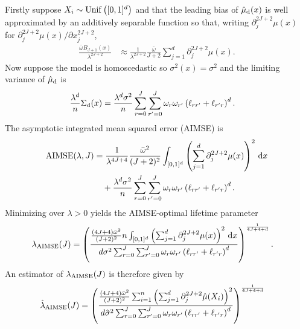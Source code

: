 Firstly suppose $X_i \sim \operatorname{Unif}\big([0,1]^d\big)$
and that the leading bias of $\hat\mu_{\mathrm{d}}(x)$ is well approximated by an
additively separable function so that,
writing $\partial^{2 J + 2}_j \mu(x)$
for $\partial^{2 J + 2}_j \mu(x) / \partial x_j^{2 J + 2}$,
%
\begin{align*}
  \frac{\bar \omega B_{J+1}(x)}{\lambda^{2 J + 2}}
  &\approx
  \frac{1}{\lambda^{2 J + 2}}
  \frac{\bar \omega }{J + 2}
  \sum_{j=1}^d
  \partial^{2 J + 2}_j \mu(x).
\end{align*}
%
Now suppose the model is homoscedastic so $\sigma^2(x) = \sigma^2$ and
the limiting variance of $\hat\mu_{\mathrm{d}}$ is
%
\begin{align*}
  \frac{\lambda^d}{n}
  \Sigma_{\mathrm{d}}(x)
  &=
  \frac{\lambda^d \sigma^2}{n}
  \sum_{r=0}^{J}
  \sum_{r'=0}^{J}
  \omega_r
  \omega_{r'}
  \left( \ell_{r r'} + \ell_{r' r} \right)^d.
\end{align*}
%
The asymptotic integrated mean squared error (AIMSE) is
%
\begin{align*}
  \operatorname{AIMSE}(\lambda, J)
  &=
  \frac{1}{\lambda^{4 J + 4}}
  \frac{\bar \omega^2}{(J + 2)^2}
  \int_{[0,1]^d}
  \left(
    \sum_{j=1}^d
    \partial^{2 J + 2}_j \mu(x)
  \right)^2
  \,\mathrm{d}x \\
  &\quad+
  \frac{\lambda^d \sigma^2}{n}
  \sum_{r=0}^{J}
  \sum_{r'=0}^{J}
  \omega_r
  \omega_{r'}
  \left( \ell_{r r'} + \ell_{r' r} \right)^d.
\end{align*}
%
Minimizing over $\lambda > 0$ yields the AIMSE-optimal lifetime parameter
%
\begin{align*}
  \lambda_{\operatorname{AIMSE}}(J)
  &=
  \left(
    \frac{
      \frac{(4 J + 4) \bar \omega^2}{(J + 2)^2}
      n \int_{[0,1]^d}
      \left(
        \sum_{j=1}^d
        \partial^{2 J + 2}_j \mu(x)
      \right)^2
      \,\mathrm{d}x
    }{
      d \sigma^2
      \sum_{r=0}^{J}
      \sum_{r'=0}^{J}
      \omega_r
      \omega_{r'}
      \left( \ell_{r r'} + \ell_{r' r} \right)^d
    }
  \right)^{\frac{1}{4 J + 4 + d}}.
\end{align*}
%
An estimator of $\lambda_{\operatorname{AIMSE}}(J)$ is therefore given by
%
\begin{align*}
  \hat\lambda_{\operatorname{AIMSE}}(J)
  &=
  \left(
    \frac{
      \frac{(4 J + 4) \bar \omega^2}{(J + 2)^2}
      \sum_{i=1}^n
      \left(
        \sum_{j=1}^d
        \partial^{2 J + 2}_j \hat\mu(X_i)
      \right)^2
    }{
      d \hat\sigma^2
      \sum_{r=0}^{J}
      \sum_{r'=0}^{J}
      \omega_r
      \omega_{r'}
      \left( \ell_{r r'} + \ell_{r' r} \right)^d
    }
  \right)^{\frac{1}{4 J + 4 + d}}
\end{align*}
